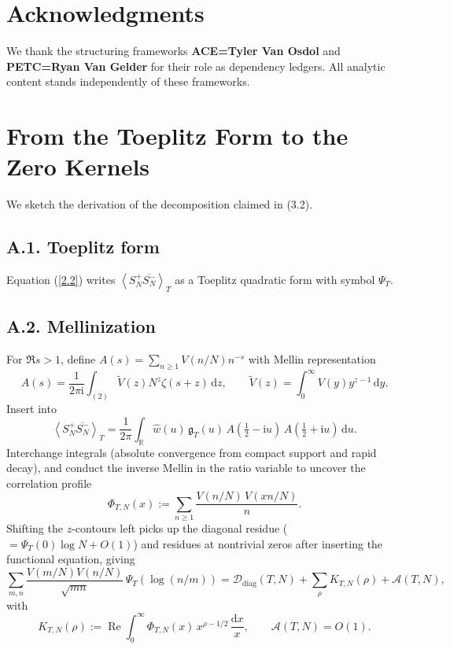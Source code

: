 \documentclass[11pt]{article}
\newcommand{\RR}{\mathbb{R}}
\newcommand{\ii}{\mathrm{i}}
\newcommand{\dd}{\mathrm{d}}
\newcommand{\avg}[1]{\left\langle #1 \right\rangle}
\newcommand{\widehatw}{\widehat{w}}
\newcommand{\Rea}{\operatorname{Re}}
\newcommand{\zetaR}{\zeta}
\begin{document}
\section*{Acknowledgments}
We thank the structuring frameworks \textbf{ACE=Tyler Van Osdol} and \textbf{PETC=Ryan Van Gelder} for their role as dependency ledgers. All analytic content stands independently of these frameworks.

\appendix

\section{From the Toeplitz Form to the Zero Kernels} \label{app:explicit}
We sketch the derivation of the decomposition claimed in (3.2).

\subsection*{A.1. Toeplitz form}
Equation (\ref{2.2}) writes $\avg{ S_N^+\overline{S_N^-}}_T$ as a Toeplitz quadratic form with symbol $\Psi_T$.

\subsection*{A.2. Mellinization}
For $\Re s>1$, define $A(s)=\sum_{n\ge1} V(n/N) n^{-s}$ with Mellin representation
\[
A(s)=\frac{1}{2\pi \ii}\int_{(2)} \widetilde V(z) N^z \zetaR(s+z)\,\dd z,\qquad \widetilde V(z)=\int_0^\infty V(y) y^{z-1}\,\dd y.
\]
Insert into
\[
\avg{ S_N^+\overline{S_N^-}}_T=\frac{1}{2\pi}\int_{\RR}\widehatw(u)\,\mathfrak g_T(u)\,A(\tfrac12-\ii u)\,A(\tfrac12+\ii u)\,\dd u.
\tag{4.1a}
\]
Interchange integrals (absolute convergence from compact support and rapid decay), and conduct the inverse Mellin in the ratio variable to uncover the correlation profile
\begin{equation}
\Phi_{T,N}(x):=\sum_{n\ge1} \frac{V(n/N)\,V(xn/N)}{n}.
\tag{3.3a}
\end{equation}
Shifting the $z$-contours left picks up the diagonal residue ($=\Psi_T(0)\log N+O(1)$) and residues at nontrivial zeros after inserting the functional equation, giving
\begin{equation}
\sum_{m,n}\frac{V(m/N)V(n/N)}{\sqrt{mn}}\,\Psi_T(\log(n/m))
=\mathcal D_{\mathrm{diag}}(T,N)+\sum_{\rho}K_{T,N}(\rho)+\mathcal A(T,N),
\tag{3.2}
\end{equation}
with
\[
K_{T,N}(\rho):=\Rea\int_0^\infty \Phi_{T,N}(x)\,x^{\rho-1/2}\,\frac{\dd x}{x},\qquad \mathcal A(T,N)=O(1).
\]
\end{document}
